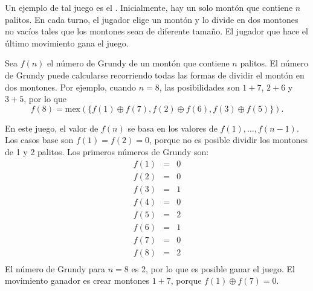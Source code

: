 
Un ejemplo de tal juego es el .
Inicialmente, hay un solo montón que contiene $n$ palitos.
En cada turno, el jugador elige un montón y lo divide
en dos montones no vacíos tales que los montones
sean de diferente tamaño.
El jugador que hace el último movimiento gana el juego.

Sea $f(n)$ el número de Grundy de un montón
que contiene $n$ palitos.
El número de Grundy puede calcularse recorriendo
todas las formas de dividir el montón en
dos montones.
Por ejemplo, cuando $n=8$, las posibilidades
son $1+7$, $2+6$ y $3+5$, por lo que
\[f(8)=\textrm{mex}(\{f(1) \oplus f(7), f(2) \oplus f(6), f(3) \oplus f(5)\}).\]

En este juego, el valor de $f(n)$ se basa en los valores
de $f(1),\ldots,f(n-1)$.
Los casos base son $f(1)=f(2)=0$,
porque no es posible dividir los montones
de 1 y 2 palitos.
Los primeros números de Grundy son:
\[
\begin{array}{lcl}
f(1) & = & 0 \\
f(2) & = & 0 \\
f(3) & = & 1 \\
f(4) & = & 0 \\
f(5) & = & 2 \\
f(6) & = & 1 \\
f(7) & = & 0 \\
f(8) & = & 2 \\
\end{array}
\]
El número de Grundy para $n=8$ es 2,
por lo que es posible ganar el juego.
El movimiento ganador es crear montones
$1+7$, porque $f(1) \oplus f(7) = 0$.

